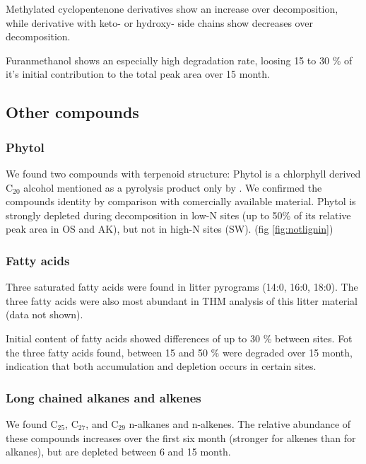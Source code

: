 \documentclass[preprint,review,12pt]{elsarticle}
\begin{document}
Methylated cyclopentenone derivatives show an increase over decomposition, while derivative with keto- or hydroxy- side chains show decreases over decomposition.

Furanmethanol shows an especially high degradation rate, loosing 15 to 30 \% of it's initial contribution to the total peak area over 15 month.


\subsection{Other compounds}
\subsubsection{Phytol}
 
We found two compounds with terpenoid structure: Phytol is a chlorphyll derived C$_{20}$ alcohol  mentioned as a pyrolysis product only by \cite{Schwarzinger??}. We confirmed the compounds identity by comparison with comercially available material. Phytol is strongly depleted during decomposition in low-N sites (up to 50\% of its relative peak area in OS and AK), but not in high-N sites (SW). (fig \ref{fig:notlignin})




\subsubsection{Fatty acids}
Three saturated fatty acids were found in litter pyrograms (14:0, 16:0, 18:0). The three fatty acids were also most abundant in THM analysis of this litter material (data not shown).

Initial content of fatty acids showed differences of up to 30 \% between sites.
Fot the three fatty acids found, between 15 and 50 \% were degraded over 15 month, indication that both accumulation and depletion occurs in certain sites.

\subsubsection{Long chained alkanes and alkenes}

We found C$_{25}$, C$_{27}$, and C$_{29}$ n-alkanes and n-alkenes. The relative abundance of these compounds increases over the first six month (stronger for alkenes than for alkanes), but are depleted between 6 and 15 month. 
\end{document}

